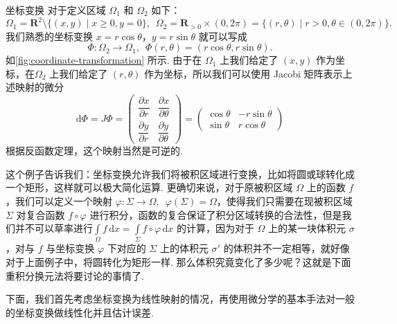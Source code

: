 \begin{example}{坐标变换}{}
    对于定义区域 $\Omega_1$ 和 $\Omega_2$ 如下：
    \[\Omega_1 = \mathbf{R}^2\setminus\{(x, y) \mid x\geqslant 0, y = 0\},\enspace \Omega_2 = \mathbf{R}_{>0}\times (0, 2\pi) = \{(r, \theta) \mid r>0, \theta\in(0, 2\pi)\}.\]
    我们熟悉的坐标变换 $x = r\cos\theta$，$y = r\sin\theta$ 就可以写成 \[\Phi\colon \Omega_2\to\Omega_1,\enspace \Phi(r, \theta) = (r\cos\theta, r\sin\theta).\]
    如\autoref{fig:coordinate-transformation} 所示. 由于在 $\Omega_1$ 上我们给定了 $(x, y)$ 作为坐标，在$\Omega_2$ 上我们给定了 $(r, \theta)$ 作为坐标，所以我们可以使用 Jacobi 矩阵表示上述映射的微分
    \[
        \mathrm{d}\Phi = J\Phi = \begin{pmatrix}
            \dfrac{\partial x}{\partial r} & \dfrac{\partial x}{\partial \theta} \\[2ex]
            \dfrac{\partial y}{\partial r} & \dfrac{\partial y}{\partial \theta}
        \end{pmatrix} = \begin{pmatrix}
            \cos\theta & -r\sin\theta \\
            \sin\theta & r\cos\theta
        \end{pmatrix}
    \]
    根据反函数定理，这个映射当然是可逆的.
\end{example}

这个例子告诉我们：坐标变换允许我们将被积区域进行变换，比如将圆或球转化成一个矩形，这样就可以极大简化运算. 更确切来说，对于原被积区域 $\Omega$ 上的函数 $f$，我们可以定义一个映射 $\varphi\colon \Sigma \to \Omega,\enspace \varphi(\Sigma) = \Omega$，使得我们只需要在现被积区域 $\Sigma$ 对复合函数 $f\circ\varphi$ 进行积分，函数的复合保证了积分区域转换的合法性，但是我们并不可以草率进行$\displaystyle\int\limits_{\Omega}f\,\mathrm{d}x = \int\limits_{\Sigma}f\circ \varphi\,\mathrm{d}x$ 的计算，因为对于 $\Omega$ 上的某一块体积元 $\sigma$，对与 $f$ 与坐标变换 $\varphi$ 下对应的 $\Sigma$ 上的体积元 $\sigma'$ 的体积并不一定相等，就好像对于上面例子中，将圆转化为矩形一样. 那么体积究竟变化了多少呢？这就是下面重积分换元法将要讨论的事情了.

下面，我们首先考虑坐标变换为线性映射的情况，再使用微分学的基本手法对一般的坐标变换做线性化并且估计误差.

